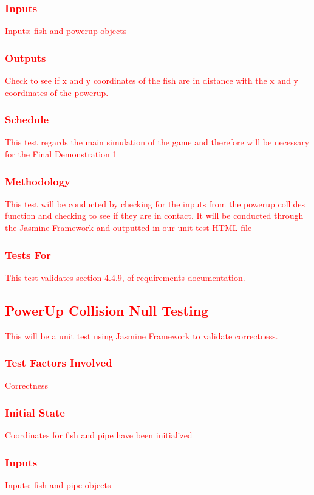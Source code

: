 \documentclass[11pt, oneside]{article}   	%
\begin{document}
\subsubsection{\textcolor{red}{Inputs}}
\textcolor{red}{Inputs: fish and powerup objects}
\subsubsection{\textcolor{red}{Outputs}}
\textcolor{red}{Check to see if x and y coordinates of the fish are in distance with the x and y coordinates of the powerup.}
\subsubsection{\textcolor{red}{Schedule}}
\textcolor{red}{This test regards the main simulation of the game and therefore will be necessary for the Final Demonstration 1}
\subsubsection{\textcolor{red}{Methodology}}
\textcolor{red}{This test will be conducted by checking for the inputs from the powerup collides function and checking to see if they are in contact. It will be conducted through the Jasmine Framework and outputted in our unit test HTML file}
\subsubsection{\textcolor{red}{Tests For}}
\textcolor{red}{This test validates section 4.4.9, of requirements documentation.}



\subsection{\textcolor{red}{PowerUp Collision Null Testing}}
\textcolor{red}{This will be a unit test using Jasmine Framework to validate correctness.}
\subsubsection{\textcolor{red}{Test Factors Involved}}
\textcolor{red}{Correctness}
\subsubsection{\textcolor{red}{Initial State}}
\textcolor{red}{Coordinates for fish and pipe have been initialized}
\subsubsection{\textcolor{red}{Inputs}}
\textcolor{red}{Inputs: fish and pipe objects}
\end{document}

